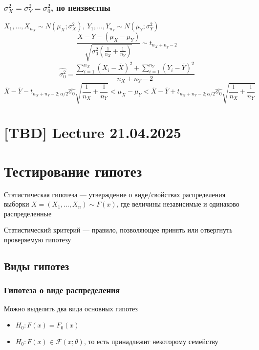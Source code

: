 \documentclass[a4paper, 10pt]{article}
\begin{document}
\subsubsection{$\sigma^2_X=\sigma^2_Y=\sigma^2_0$, но неизвестны}
$X_1,\ldots,X_{n_X}\sim N(\mu_X;\sigma^2_X),\ Y_1,\ldots,Y_{n_Y}\sim N(\mu_Y;\sigma^2_Y)$
\begin{equation*}
    \frac{\overline{X}-\overline{Y}-(\mu_X-\mu_Y)}{\sqrt{\sigma^2_0\left(\frac{1}{n_X}+\frac{1}{n_Y}\right)}}\sim t_{n_X+n_y-2}
\end{equation*}
\begin{equation*}
    \widehat{\sigma^2_0}=\frac{\sum_{i=1}^{n_X}\left(X_i-\overline{X}\right)^2+\sum_{i=1}^{n_Y}\left(Y_i-\overline{Y}\right)^2}{n_X+n_Y-2}
\end{equation*}
\begin{equation*}
    \overline{X}-\overline{Y}-t_{n_X+n_Y-2;\alpha/2}\widehat{\sigma_0}\sqrt{\frac{1}{n_X}+\frac{1}{n_Y}}<\mu_X-\mu_Y<\overline{X}-\overline{Y}+t_{n_X+n_Y-2;\alpha/2}\widehat{\sigma_0}\sqrt{\frac{1}{n_X}+\frac{1}{n_Y}}
\end{equation*}

\newpage
\section{[TBD] Lecture 21.04.2025}

\newpage
\section{Тестирование гипотез}
 Статистическая гипотеза — утверждение о виде/свойствах распределения выборки $X=(X_1,\ldots,X_n)\sim F(x)$, где величины независимые и одинаково распределенные

 Статистический критерий — правило, позволяющее принять или отвергнуть проверяемую гипотезу

\subsection{Виды гипотез}
\subsubsection{Гипотеза о виде распределения} 
Можно выделить два вида основных гипотез
\begin{itemize}
    \item $H_0:F(x)=F_0(x)$
    \item $H_0:F(x)\in\mathcal{F}(x;\theta)$, то есть принадлежит некоторому семейству
\end{itemize}
\end{document}
